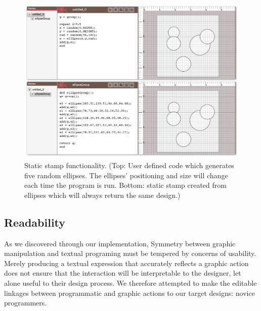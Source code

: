 \documentclass{sigchi}
\begin{document}
\begin{center}
\begin{figure}[h!]
\includegraphics[width=\columnwidth]{images/stamps.jpg}
\caption{Static stamp functionality. (Top: User defined code which generates five random ellipses. The ellipses' positioning and size will change each time the program is run. Bottom: static stamp created from ellipses which will always return the same design.)}
\label{fig:stamps}
\end{figure}
\end{center}
\vspace{-20pt}

\subsection{Readability}
As we discovered through our implementation, Symmetry between graphic manipulation and textual programing must be tempered by concerns of usability. Merely producing a textual expression that accurately reflects a graphic action does not ensure that the interaction will be interpretable to the designer, let alone useful to their design process. We therefore attempted to make the editable linkages between programmatic and graphic actions to our target designs: novice programmers. 
\end{document}
